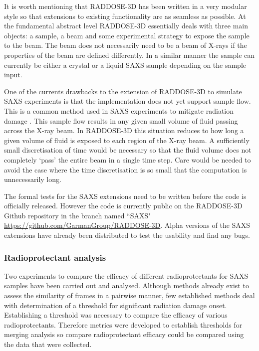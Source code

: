 It is worth mentioning that RADDOSE-3D has been written in a very modular style so that extensions to existing functionality are as seamless as possible.
At the fundamental abstract level RADDOSE-3D essentially deals with three main objects: a sample, a beam and some experimental strategy to expose the sample to the beam.
The beam does not necessarily need to be a beam of X-rays if the properties of the beam are defined differently.
In a similar manner the sample can currently be either a crystal or a liquid SAXS sample depending on the sample input.

One of the currents drawbacks to the extension of RADDOSE-3D to simulate SAXS experiments is that the implementation does not yet support sample flow.
This is a common method used in SAXS experiments to mitigate radiation damage \cite{jeffries2015limiting}.
This sample flow results in any given small volume of fluid passing across the X-ray beam.
In RADDOSE-3D this situation reduces to how long a given volume of fluid is exposed to each region of the X-ray beam.
A sufficiently small discretisation of time would be necessary so that the fluid volume does not completely `pass' the entire beam in a single time step.
Care would be needed to avoid the case where the time discretisation is so small that the computation is unnecessarily long.

The formal tests for the SAXS extensions need to be written before the code is officially released.
However the code is currently public on the RADDOSE-3D Github repository in the branch named ``SAXS" \url{https://github.com/GarmanGroup/RADDOSE-3D}.
Alpha versions of the SAXS extensions have already been distributed to test the usability and find any bugs.

\subsubsection{Radioprotectant analysis}
\label{subs:Radioprotectant analysis}
Two experiments to compare the efficacy of different radioprotectants for SAXS samples have been carried out and analysed.
Although methods already exist to assess the similarity of frames in a pairwise manner, few established methods deal with determination of a threshold for significant radiation damage onset.
Establishing a threshold was necessary to compare the efficacy of various radioprotectants.
Therefore metrics were developed to establish thresholds for merging analysis so compare radioprotectant efficacy could be compared using the data that were collected.

